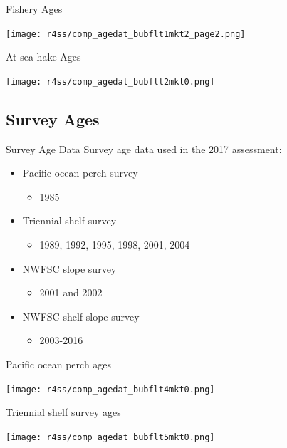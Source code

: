 \documentclass[pdf]{beamer}\usepackage[]{graphicx}\usepackage[]{color}
\begin{document}
\begin{frame}{Fishery Ages}
  \begin{center}
    \texttt{[image: r4ss/comp\_agedat\_bubflt1mkt2\_page2.png]}
  \end{center}
\end{frame}

\begin{frame}{At-sea hake Ages}
  \begin{center}
    \texttt{[image: r4ss/comp\_agedat\_bubflt2mkt0.png]}
  \end{center}
\end{frame}

\subsection{Survey Ages}
\begin{frame}{Survey Age Data}
  Survey age data used in the 2017 assessment:
  \begin{itemize}
    \item Pacific ocean perch survey
      \begin{itemize}
        \item 1985
      \end{itemize}
    \item Triennial shelf survey
      \begin{itemize}
        \item 1989, 1992, 1995, 1998, 2001, 2004
      \end{itemize}
    \item NWFSC slope survey
      \begin{itemize}
        \item 2001 and 2002
      \end{itemize}
    \item NWFSC shelf-slope survey
      \begin{itemize}
        \item 2003-2016
      \end{itemize}
  \end{itemize}
\end{frame}

\begin{frame}{Pacific ocean perch ages}
  \begin{center}
    \texttt{[image: r4ss/comp\_agedat\_bubflt4mkt0.png]}
  \end{center}
\end{frame}

\begin{frame}{Triennial shelf survey ages}
  \begin{center}
    \texttt{[image: r4ss/comp\_agedat\_bubflt5mkt0.png]}
  \end{center}
\end{frame}
\end{document}
